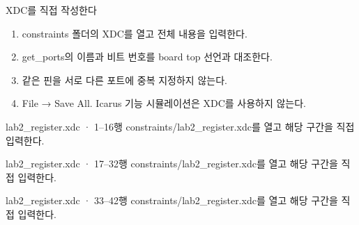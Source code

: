 \begin{frame}{XDC를 직접 작성한다}
\small
\begin{enumerate}
\item constraints 폴더의 XDC를 열고 전체 내용을 입력한다.
\item get\_ports의 이름과 비트 번호를 board top 선언과 대조한다.
\item 같은 핀을 서로 다른 포트에 중복 지정하지 않는다.
\item File → Save All. Icarus 기능 시뮬레이션은 XDC를 사용하지 않는다.
\end{enumerate}
\end{frame}

\begin{frame}{lab2\_register.xdc · 1–16행}
\small
constraints/lab2\_register.xdc를 열고 해당 구간을 직접 입력한다.\par\vspace{0.4cm}\par\vspace{0.4cm}
\end{frame}

\begin{frame}{lab2\_register.xdc · 17–32행}
\small
constraints/lab2\_register.xdc를 열고 해당 구간을 직접 입력한다.\par\vspace{0.4cm}\par\vspace{0.4cm}
\end{frame}

\begin{frame}{lab2\_register.xdc · 33–42행}
\small
constraints/lab2\_register.xdc를 열고 해당 구간을 직접 입력한다.\par\vspace{0.4cm}\par\vspace{0.4cm}
\end{frame}

